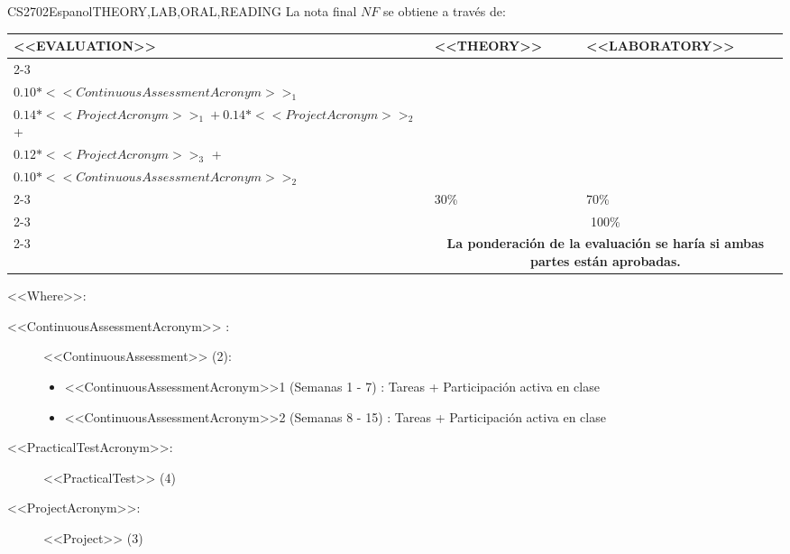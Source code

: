   \begin{evaluation}{CS2702}{Espanol}{THEORY,LAB,ORAL,READING}
  La nota final $NF$ se obtiene a través de:

  \begin{tabularx}{0.9\textwidth}{|X|p{}|p{}|} \hline
  \multirow{4}{*}{\uppercase{<<Evaluation>>}} & \uppercase{<<Theory>>} & \uppercase{<<Laboratory>>} \\ \cline{2-3}
  & %
      \begin{minipage}{0.95\textwidth}
      \begin{tabular}{l}
          $0.10*<<PracticalTestAcronym>>_{1} + 0.10*<<PracticalTestAcronym>>_{2}$ + \\  
          $0.10*<<ContinuousAssessmentAcronym>>_{1}$
      \end{tabular} 
      \end{minipage} 
  & %
      \begin{minipage}{0.95\textwidth}
      \begin{tabular}{l}
          $0.10*<<PracticalTestAcronym>>_{3} + 0.10*<<PracticalTestAcronym>>_{4}$ + \\ 
          $0.14*<<ProjectAcronym>>_{1} + 0.14*<<ProjectAcronym>>_{2}$  +\\
          $0.12*<<ProjectAcronym>>_{3}$ +\\
          $0.10*<<ContinuousAssessmentAcronym>>_{2}$
          \end{tabular} 
      \end{minipage}                 \\ \cline{2-3}
  
  & %
  30\% 
  & %
  70\% \\ \cline{2-3}
  & \multicolumn{2}{c|}{100\%}  \\ \cline{2-3}
  & \multicolumn{2}{c|}{\textbf{La ponderación de la evaluación se haría si ambas partes están aprobadas.}}  \\ \hline
  \end{tabularx}
  
  \vspace{2mm}
  \noindent <<Where>>:
  \begin{description}
    \item[<<ContinuousAssessmentAcronym>> :] <<ContinuousAssessment>> (2):
      \begin{itemize}
             \item  <<ContinuousAssessmentAcronym>>1 (Semanas 1 - 7) : Tareas + Participación activa en clase
              \item <<ContinuousAssessmentAcronym>>2 (Semanas 8 - 15) : Tareas + Participación activa en clase
       \end{itemize}
    \item[<<PracticalTestAcronym>>:] <<PracticalTest>> (4)
    \item[<<ProjectAcronym>>:] <<Project>> (3)    
  \end{description}
  

\end{evaluation}
